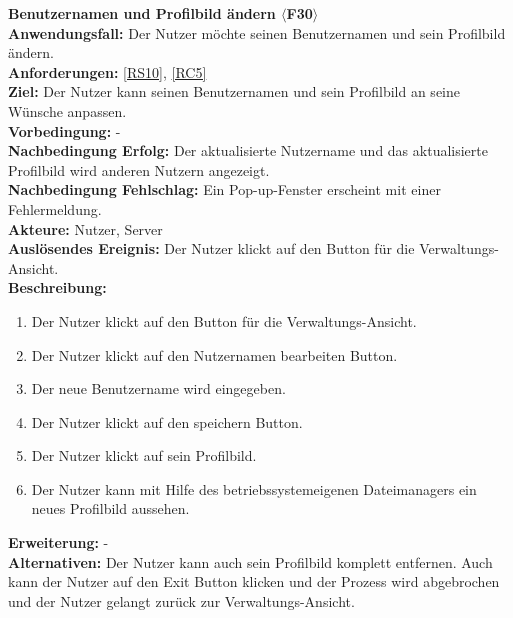 \documentclass[parskip=full]{scrartcl}
\begin{document}
\textbf{Benutzernamen und Profilbild ändern $\langle$F30$\rangle$}\\
\textbf{Anwendungsfall:} Der Nutzer möchte seinen Benutzernamen und sein Profilbild ändern.\\
\textbf{Anforderungen:} \ref{RS10}, \ref{RC5}\\
\textbf{Ziel:} Der Nutzer kann seinen Benutzernamen und sein Profilbild an seine Wünsche anpassen.\\
\textbf{Vorbedingung:} -\\
\textbf{Nachbedingung Erfolg:} Der aktualisierte Nutzername und das aktualisierte Profilbild wird anderen Nutzern angezeigt.\\
\textbf{Nachbedingung Fehlschlag:} Ein Pop-up-Fenster erscheint mit einer Fehlermeldung.\\
\textbf{Akteure:} Nutzer, Server\\
\textbf{Auslösendes Ereignis:} Der Nutzer klickt auf den Button für die Verwaltungs-Ansicht.\\
\textbf{Beschreibung:}
\begin{enumerate}
    \item Der Nutzer klickt auf den Button für die Verwaltungs-Ansicht.\\
    \item Der Nutzer klickt auf den Nutzernamen bearbeiten Button.
    \item Der neue Benutzername wird eingegeben.
    \item Der Nutzer klickt auf den speichern Button.
    \item Der Nutzer klickt auf sein Profilbild.
    \item Der Nutzer kann mit Hilfe des betriebssystemeigenen Dateimanagers ein neues Profilbild aussehen.
\end{enumerate}
\textbf{Erweiterung:} -\\
\textbf{Alternativen:} Der Nutzer kann auch sein Profilbild komplett entfernen. Auch kann der Nutzer auf den Exit Button klicken und der Prozess wird abgebrochen und der Nutzer gelangt zurück zur Verwaltungs-Ansicht.\\
\newpage
\end{document}
